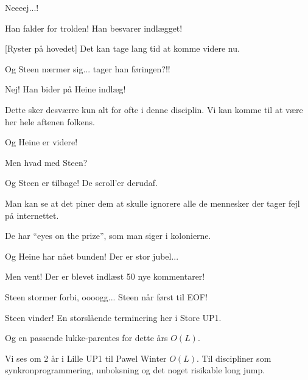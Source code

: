 \documentclass[a4paper,11pt]{article}
\begin{document}
\begin{sketch}
   Neeeej...!

   Han falder for trolden! Han besvarer indlægget!


  [Ryster på hovedet] Det kan tage lang tid at komme videre nu.


    Og Steen nærmer sig... tager han føringen?!!


    Nej! Han bider på Heine indlæg!




     Dette sker desværre kun alt for ofte i denne disciplin. Vi kan
   komme til at være her hele aftenen folkens.


    Og Heine er videre!

    Men hvad med Steen?


    Og Steen er tilbage! De scroll'er derudaf.

    Man kan se at det piner dem at skulle ignorere alle de mennesker
   der tager fejl på internettet.

    De har "`eyes on the prize"', som man siger i kolonierne.


    Og Heine har nået bunden! Der er stor jubel...

    Men vent! Der er blevet indlæst 50 nye kommentarer!

    Steen stormer forbi, oooogg... Steen når først til EOF!

    Steen vinder! En storslående terminering her i Store UP1.

    Og en passende lukke-parentes for dette års $O(L)$.

    Vi ses om 2 år i Lille UP1 til Pawel Winter $O(L)$. Til discipliner
    som synkronprogrammering, unboksning og det noget risikable long jump.


\end{sketch}
\end{document}
